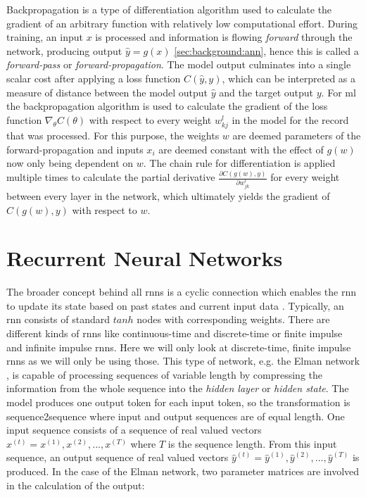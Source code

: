 Backpropagation is a type of differentiation algorithm used to calculate the gradient of an arbitrary function with relatively low computational effort. 
During training, an input $x$ is processed and information is flowing \textit{forward} through the network, producing output $\hat{y} = g(x)$ \ref{sec:background:ann}, hence this is called a \textit{forward-pass} or \textit{forward-propagation}. The model output culminates into a single scalar cost after applying a loss function $C(\hat{y}, y)$, which can be interpreted as a measure of distance between the model output $\hat{y}$ and the target output $y$. For \gls{ml} the backpropagation algorithm is used to calculate the gradient of the loss function $\nabla_\theta C(\theta)$ with respect to every weight $w^l_{kj}$ in the model for the record that was processed. For this purpose, the weights $w$ are deemed parameters of the forward-propagation and inputs $x_i$ are deemed constant with the effect of $g(w)$ now only being dependent on $w$. The chain rule for differentiation is applied multiple times to calculate the partial derivative $\frac{\partial C(g(w),y)}{\partial w^l_{jk}}$ for every weight between every layer in the network, which ultimately yields the gradient of $C(g(w),y)$ with respect to $w$.

\section{Recurrent Neural Networks} \label{sec:background:rnn}

The broader concept behind all \glspl{rnn} is a cyclic connection which enables the \gls{rnn} to update its state based on past states and current input data \cite{rnn_review}. Typically, an \gls{rnn} consists of standard $tanh$ nodes with corresponding weights. There are different kinds of \glspl{rnn} like continuous-time and discrete-time or finite impulse and infinite impulse \glspl{rnn}. Here we will only look at discrete-time, finite impulse \glspl{rnn} as we will only be using those. This type of network, e.g. the Elman network \cite{rnn_elman}, is capable of processing sequences of variable length by compressing the information from the whole sequence into the \textit{hidden layer} or \textit{hidden state}. The model produces one output token for each input token, so the transformation is sequence2sequence where input and output sequences are of equal length. One input sequence consists of a sequence of real valued vectors $x^{(t)} = x^{(1)}, x^{(2)}, ... , x^{(T)}$ where $T$ is the sequence length. From this input sequence, an output sequence of real valued vectors $\hat{y}^{(t)} = \hat{y}^{(1)}, \hat{y}^{(2)}, ... , \hat{y}^{(T)}$ is produced. In the case of the Elman network, two parameter matrices are involved in the calculation of the output:


